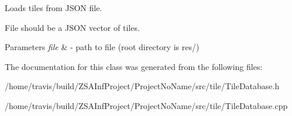 Loads tiles from J\-S\-O\-N file. 

File should be a J\-S\-O\-N vector of tiles. 
\begin{DoxyParams}{Parameters}
{\em file} & -\/ path to file (root directory is res/) \\
\hline
\end{DoxyParams}


The documentation for this class was generated from the following files\-:\begin{DoxyCompactItemize}
\item 
/home/travis/build/\-Z\-S\-A\-Inf\-Project/\-Project\-No\-Name/src/tile/Tile\-Database.\-h\item 
/home/travis/build/\-Z\-S\-A\-Inf\-Project/\-Project\-No\-Name/src/tile/Tile\-Database.\-cpp\end{DoxyCompactItemize}
